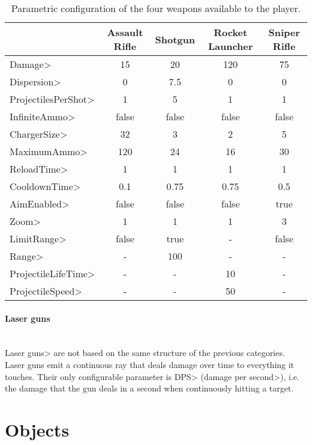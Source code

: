 \begin{table}[p]
\setlength\extrarowheight{2pt}
\begin{tabularx}{\textwidth}{|l|C|C|C|C|}
& Assault Rifle & Shotgun & Rocket Launcher & Sniper Rifle  \\
\hline
\<Damage> & 15  & 20  &  120 & 75  \\
\hline
\<Dispersion> & 0  & 7.5  & 0  & 0  \\
\hline
\<ProjectilesPerShot> &  1 &  5 & 1  & 1  \\
\hline
\<InfiniteAmmo> & false & false  & false &   false\\
\hline
\<ChargerSize> & 32  & 3  &  2 &  5 \\
\hline
\<MaximumAmmo> &  120 &  24 & 16  & 30  \\
\hline
\<ReloadTime> &  1 & 1  &  1 & 1  \\
\hline
\<CooldownTime> &  0.1 &  0.75 &  0.75 &  0.5 \\
\hline
\<AimEnabled> &  false & false  & false  & true  \\
\hline
\<Zoom> & 1  &  1 &  1 & 3  \\
\hline
\<LimitRange> & false  & true  &  - & false  \\
\hline
\<Range> &  - &  100 &  - &  - \\
\hline
\<ProjectileLifeTime> & -  & -  & 10  & -  \\
\hline
\<ProjectileSpeed> &  - &  - & 50 &  - \\
\hline
\end{tabularx}
\caption{Parametric configuration of the four weapons available to the player.}
    \label{tab:gunconfig}
\end{table}

\paragraph{Laser guns}

\mbox{}\\

{\setlength{\parindent}{0cm}
\<Laser guns> are not based on the same structure of the previous categories. Laser guns emit a continuous ray that deals damage over time to everything it touches. Their only configurable parameter is \<DPS> (\<damage per second>), i.e. the damage that the gun deals in a second when continuously hitting a target.
}


\section{Objects}

